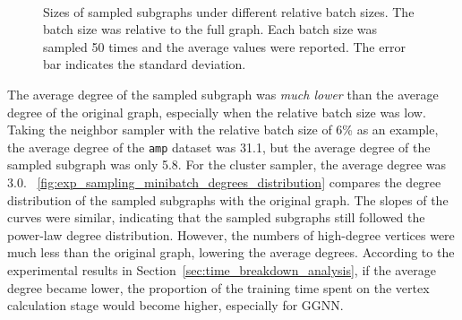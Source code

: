 \begin{figure}[H]
    \centering
     \\
    \caption{Sizes of sampled subgraphs under different relative batch sizes. The batch size was relative to the full graph. Each batch size was sampled 50 times and the average values were reported. The error bar indicates the standard deviation.}
    \label{fig:exp_sampling_minibatch_graph_info}
\end{figure}

The average degree of the sampled subgraph was \emph{much lower} than the average degree of the original graph, especially when the relative batch size was low.
%
Taking the neighbor sampler with the relative batch size of 6\% as an example, the average degree of the \texttt{amp} dataset was 31.1, but the average degree of the sampled subgraph was only 5.8.
%
For the cluster sampler, the average degree was 3.0.
%
\figurename~\ref{fig:exp_sampling_minibatch_degrees_distribution} compares the degree distribution of the sampled subgraphs with the original graph.
%
The slopes of the curves were similar, indicating that the sampled subgraphs still followed the power-law degree distribution.
%
However, the numbers of high-degree vertices were much less than the original graph, lowering the average degrees.
%
According to the experimental results in Section~\ref{sec:time_breakdown_analysis}, if the average degree became lower, the proportion of the training time spent on the vertex calculation stage would become higher, especially for GGNN.

